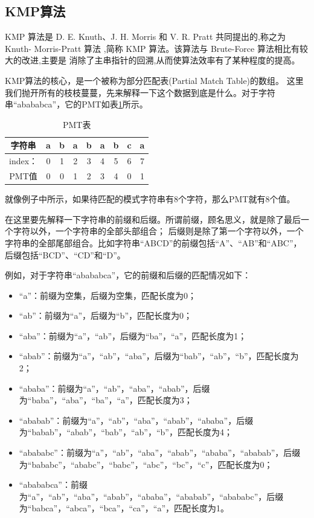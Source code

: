 \documentclass[lang=cn,newtx,10pt,scheme=chinese]{elegantbook}
\begin{document}
\subsection{KMP算法}

KMP 算法是 D. E. Knuth、J. H. Morris 和 V. R. Pratt 共同提出的,称之为 Knuth-
Morris-Pratt 算法 ,简称 KMP 算法。该算法与 Brute-Force 算法相比有较大的改进,主要是
消除了主串指针的回溯,从而使算法效率有了某种程度的提高。

KMP算法的核心，是一个被称为部分匹配表(Partial Match Table)的数组。
这里我们抛开所有的枝枝蔓蔓，先来解释一下这个数据到底是什么。对于字符串“abababca”，它的PMT如表\ref{table:PMT}所示。


\begin{table}[htbp]
  \centering
  \caption{PMT表}
  \begin{tabular}{|c|c|c|c|c|c|c|c|c|}
    \hline
    字符串 & a & b & a & b & a & b & c & a \\
    \hline
    index： & 0 & 1 & 2 & 3 & 4 & 5 & 6 & 7 \\
    \hline
    PMT值 & 0 & 0 & 1 & 2 & 3 & 4 & 0 & 1 \\
    \hline
  \end{tabular}
  \label{table:PMT}
\end{table}

就像例子中所示，如果待匹配的模式字符串有8个字符，那么PMT就有8个值。

在这里要先解释一下字符串的前缀和后缀。所谓前缀，顾名思义，就是除了最后一个字符以外，一个字符串的全部头部组合；
后缀则是除了第一个字符以外，一个字符串的全部尾部组合。比如字符串“ABCD”的前缀包括“A”、“AB”和“ABC”，后缀包括“BCD”、“CD”和“D”。

例如，对于字符串“abababca”，它的前缀和后缀的匹配情况如下：

\begin{itemize}
  \item “a”：前缀为空集，后缀为空集，匹配长度为0；
  \item “ab”：前缀为{“a”}，后缀为{“b”}，匹配长度为0；
  \item “aba”：前缀为{“a”，“ab”}，后缀为{“ba”，“a”}，匹配长度为1；
  \item “abab”：前缀为{“a”，“ab”，“aba”}，后缀为{“bab”，“ab”，“b”}，匹配长度为2；
  \item “ababa”：前缀为{“a”，“ab”，“aba”，“abab”}，后缀为{“baba”，“aba”，“ba”，“a”}，匹配长度为3；
  \item “ababab”：前缀为{“a”，“ab”，“aba”，“abab”，“ababa”}，后缀为{“babab”，“abab”，“bab”，“ab”，“b”}，匹配长度为4；
  \item “abababc”：前缀为{“a”，“ab”，“aba”，“abab”，“ababa”，“ababab”}，后缀为{“bababc”，“ababc”，“babc”，“abc”，“bc”，“c”}，匹配长度为0；
  \item “abababca”：前缀为{“a”，“ab”，“aba”，“abab”，“ababa”，“ababab”，“abababc”}，后缀为{“babca”，“abca”，“bca”，“ca”，“a”}，匹配长度为1。
\end{itemize}
\end{document}
